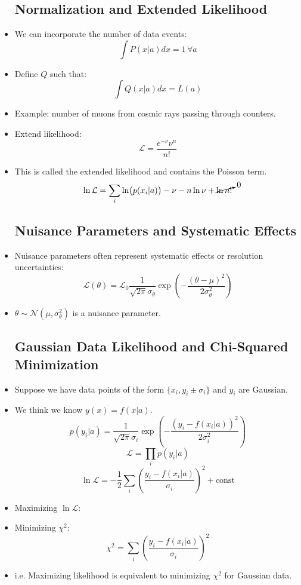\begin{itemize}
          \subsection{Normalization and Extended Likelihood}
    \item We can incorporate the number of data events:
          \[
              \int P(x|a) dx = 1 \, \forall a
          \]
    \item Define $Q$ such that:
          \[
              \int Q(x|a) dx = L(a)
          \]
    \item Example: number of muons from cosmic rays passing through counters.
    \item Extend likelihood:
          \[
              \mathcal{L} = \frac{e^{-\nu} \nu^n}{n!}
          \]
    \item This is called the extended likelihood and contains the Poisson term.
          \[
              \ln{\mathcal{L}} = \sum_{i} \ln(p(x_i|a)) - \nu - n \ln \nu + \cancelto{0}{\ln n!}
          \]

          \subsection{Nuisance Parameters and Systematic Effects}
    \item Nuisance parameters often represent systematic effects or resolution uncertainties:
          \[
              \mathcal{L}(\theta) = \mathcal{L}_{0} \frac{1}{\sqrt{2 \pi} \sigma_{\theta}} \exp \left( -\frac{(\theta - \mu)^2}{2 \sigma_{\theta}^2} \right)
          \]
    \item $\theta \sim \mathcal{N}(\mu, \sigma_{\theta}^2)$ is a nuisance parameter.

          \subsection{Gaussian Data Likelihood and Chi-Squared Minimization}
    \item Suppose we have data points of the form $\{ x_i, y_i \pm \sigma_i \}$ and $y_i$ are Gaussian.
    \item We think we know  $y(x) = f(x|a)$.
          \[
              p(y_i|a) = \frac{1}{\sqrt{2 \pi} \sigma_i} \exp \left( -\frac{(y_i - f(x_i|a))^2}{2 \sigma_i^2} \right)
          \]
          \[
              \mathcal{L} = \prod_{i} p(y_i|a)
          \]
          \[
              \ln \mathcal{L} = -\frac{1}{2} \sum_{i} \left( \frac{y_i - f(x_i|a)}{\sigma_i} \right)^2 + \text{const}
          \]
    \item Maximizing $\ln \mathcal{L}$:
    \item Minimizing $\chi^2$:
          \[
              \chi^2 = \sum_{i} \left( \frac{y_i - f(x_i|a)}{\sigma_i} \right)^2
          \]
    \item i.e. Maximizing likelihood is equivalent to minimizing $\chi^2$ for Gaussian data.


\end{itemize}
